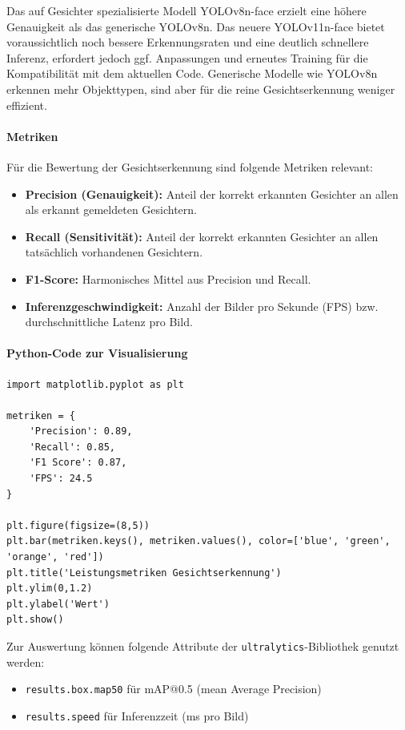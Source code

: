     Das auf Gesichter spezialisierte Modell YOLOv8n-face erzielt eine höhere Genauigkeit als das generische YOLOv8n. Das neuere YOLOv11n-face bietet voraussichtlich noch bessere Erkennungsraten und eine deutlich schnellere Inferenz, erfordert jedoch ggf. Anpassungen und erneutes Training für die Kompatibilität mit dem aktuellen Code. Generische Modelle wie YOLOv8n erkennen mehr Objekttypen, sind aber für die reine Gesichtserkennung weniger effizient.

\paragraph{Metriken}
Für die Bewertung der Gesichtserkennung sind folgende Metriken relevant:
\begin{itemize}
    \item \textbf{Precision (Genauigkeit):} Anteil der korrekt erkannten Gesichter an allen als erkannt gemeldeten Gesichtern.
    \item \textbf{Recall (Sensitivität):} Anteil der korrekt erkannten Gesichter an allen tatsächlich vorhandenen Gesichtern.
    \item \textbf{F1-Score:} Harmonisches Mittel aus Precision und Recall.
    \item \textbf{Inferenzgeschwindigkeit:} Anzahl der Bilder pro Sekunde (FPS) bzw. durchschnittliche Latenz pro Bild.
\end{itemize}

\paragraph{Python-Code zur Visualisierung}
\begin{verbatim}
import matplotlib.pyplot as plt

metriken = {
    'Precision': 0.89,
    'Recall': 0.85,
    'F1 Score': 0.87,
    'FPS': 24.5
}

plt.figure(figsize=(8,5))
plt.bar(metriken.keys(), metriken.values(), color=['blue', 'green', 'orange', 'red'])
plt.title('Leistungsmetriken Gesichtserkennung')
plt.ylim(0,1.2)
plt.ylabel('Wert')
plt.show()
\end{verbatim}

Zur Auswertung können folgende Attribute der \texttt{ultralytics}-Bibliothek genutzt werden:
\begin{itemize}
    \item \texttt{results.box.map50} für mAP@0.5 (mean Average Precision)
    \item \texttt{results.speed} für Inferenzzeit (ms pro Bild)
\end{itemize}


